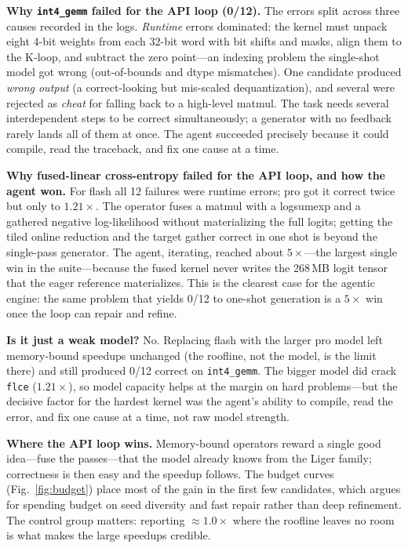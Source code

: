 \documentclass[conference]{IEEEtran}
\begin{document}
\textbf{Why \texttt{int4\_gemm} failed for the API loop (0/12).} The errors split
across three causes recorded in the logs. \emph{Runtime} errors dominated: the
kernel must unpack eight 4-bit weights from each 32-bit word with bit shifts and
masks, align them to the K-loop, and subtract the zero point---an indexing
problem the single-shot model got wrong (out-of-bounds and dtype mismatches). One
candidate produced \emph{wrong output} (a correct-looking but mis-scaled
dequantization), and several were rejected as \emph{cheat} for falling back to a
high-level matmul. The task needs several interdependent steps to be correct
simultaneously; a generator with no feedback rarely lands all of them at once.
The agent succeeded precisely because it could compile, read the traceback, and
fix one cause at a time.

\textbf{Why fused-linear cross-entropy failed for the API loop, and how the agent
won.} For flash all 12 failures were runtime errors; pro got it correct twice but
only to $1.21\times$. The operator fuses a matmul with a logsumexp and a gathered
negative log-likelihood without materializing the full logits; getting the tiled
online reduction and the target gather correct in one shot is beyond the
single-pass generator. The agent, iterating, reached about $5\times$---the largest
single win in the suite---because the fused kernel never writes the 268\,MB logit
tensor that the eager reference materializes. This is the clearest case for the
agentic engine: the same problem that yields 0/12 to one-shot generation is a
$5\times$ win once the loop can repair and refine.

\textbf{Is it just a weak model?} No. Replacing flash with the larger pro model
left memory-bound speedups unchanged (the roofline, not the model, is the limit
there) and still produced 0/12 correct on \texttt{int4\_gemm}. The bigger model
did crack \texttt{flce} ($1.21\times$), so model capacity helps at the margin on
hard problems---but the decisive factor for the hardest kernel was the agent's
ability to compile, read the error, and fix one cause at a time, not raw model
strength.

\textbf{Where the API loop wins.} Memory-bound operators reward a single good
idea---fuse the passes---that the model already knows from the Liger family;
correctness is then easy and the speedup follows. The budget curves
(Fig.~\ref{fig:budget}) place most of the gain in the first few candidates, which
argues for spending budget on seed diversity and fast repair rather than deep
refinement. The control group
matters: reporting $\approx 1.0\times$ where the roofline leaves no room is what
makes the large speedups credible.
\end{document}
